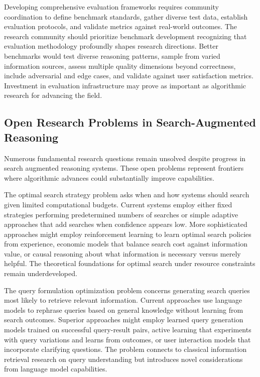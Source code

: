 Developing comprehensive evaluation frameworks requires community coordination to define benchmark standards, gather diverse test data, establish evaluation protocols, and validate metrics against real-world outcomes. The research community should prioritize benchmark development recognizing that evaluation methodology profoundly shapes research directions. Better benchmarks would test diverse reasoning patterns, sample from varied information sources, assess multiple quality dimensions beyond correctness, include adversarial and edge cases, and validate against user satisfaction metrics. Investment in evaluation infrastructure may prove as important as algorithmic research for advancing the field.

\subsection{Open Research Problems in Search-Augmented Reasoning}

Numerous fundamental research questions remain unsolved despite progress in search augmented reasoning systems. These open problems represent frontiers where algorithmic advances could substantially improve capabilities.

The optimal search strategy problem asks when and how systems should search given limited computational budgets. Current systems employ either fixed strategies performing predetermined numbers of searches or simple adaptive approaches that add searches when confidence appears low. More sophisticated approaches might employ reinforcement learning to learn optimal search policies from experience, economic models that balance search cost against information value, or causal reasoning about what information is necessary versus merely helpful. The theoretical foundations for optimal search under resource constraints remain underdeveloped.

The query formulation optimization problem concerns generating search queries most likely to retrieve relevant information. Current approaches use language models to rephrase queries based on general knowledge without learning from search outcomes. Superior approaches might employ learned query generation models trained on successful query-result pairs, active learning that experiments with query variations and learns from outcomes, or user interaction models that incorporate clarifying questions. The problem connects to classical information retrieval research on query understanding but introduces novel considerations from language model capabilities.

